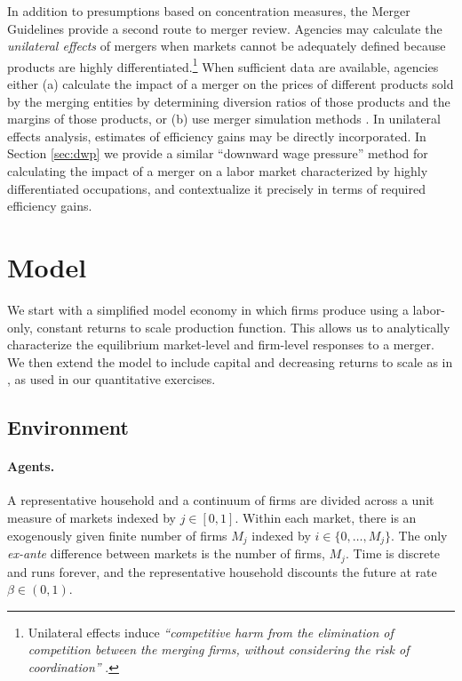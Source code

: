 \documentclass[12pt]{article}
\theoremstyle{prop}
\begin{document}
In addition to presumptions based on concentration measures, the Merger Guidelines provide a second route to merger review. 
Agencies may calculate the \textit{unilateral effects} of mergers when markets cannot be adequately defined because products are highly differentiated.\footnote{
    Unilateral effects induce \emph{``competitive harm from the elimination of competition between the merging firms, without considering the risk of coordination''} \citep[see][]{doj2023final}.} 
When sufficient data are available, agencies either (a) calculate the impact of a merger on the prices of different products sold by the merging entities by determining diversion ratios of those products and the margins of those products, or (b) use merger simulation methods \citep[][p.~36-37]{doj2023guidelines}. 
In unilateral effects analysis, estimates of efficiency gains may be directly incorporated. 
In Section \ref{sec:dwp} we provide a similar ``downward wage pressure'' method for calculating the impact of a merger on a labor market characterized by highly differentiated occupations, and contextualize it precisely in terms of required efficiency gains. 


\section{Model}\label{sec:model}

We start with a simplified model economy in which firms produce using a labor-only, constant returns to scale production function. 
This allows us to analytically characterize the equilibrium market-level and firm-level responses to a merger. 
We then extend the model to include capital and decreasing returns to scale as in , as used in our quantitative exercises. 

\subsection{Environment}

\paragraph{Agents.}
A representative household and a continuum of firms are divided across a unit measure of markets indexed by $j\in[0,1]$.    
Within each market, there is an exogenously given finite number of firms $M_j$ indexed by $i\in\{0,\ldots,M_j\}$.           
The only \emph{ex-ante} difference between markets is the number of firms, $M_j$.                                           
Time is discrete and runs forever, and the representative household discounts the future at rate $\beta\in(0,1)$.           
\end{document}
